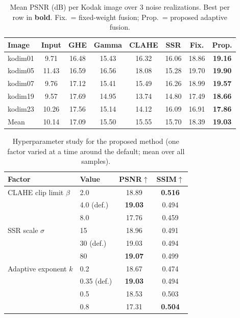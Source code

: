 \documentclass[conference,a4paper]{IEEEtran}
\begin{document}
\begin{table}[t]
\centering
\caption{Mean PSNR (dB) per Kodak image over 3 noise realizations.
Best per row in \textbf{bold}. Fix.\ = fixed-weight fusion; Prop.\ = proposed
adaptive fusion.}
\label{tab:perimage}
\setlength{\tabcolsep}{2.6pt}
\begin{tabular}{lccccccc}
\toprule
Image & Input & GHE & Gamma & CLAHE & SSR & Fix. & Prop. \\
\midrule
kodim01 & 9.71  & 16.48 & 15.43 & 16.32 & 16.06 & 18.86 & \textbf{19.16} \\
kodim05 & 11.43 & 16.59 & 16.56 & 18.08 & 15.28 & 19.70 & \textbf{19.90} \\
kodim07 & 9.76  & 17.12 & 15.41 & 15.49 & 16.26 & 18.99 & \textbf{19.57} \\
kodim19 & 9.57  & 17.69 & 14.95 & 13.74 & 14.80 & 17.49 & \textbf{18.66} \\
kodim23 & 10.26 & 17.56 & 15.14 & 14.12 & 16.09 & 16.91 & \textbf{17.86} \\
\midrule
Mean    & 10.14 & 17.09 & 15.50 & 15.55 & 15.70 & 18.39 & \textbf{19.03} \\
\bottomrule
\end{tabular}
\end{table}

\begin{table}[t]
\centering
\caption{Hyperparameter study for the proposed method (one factor varied at a
time around the default; mean over all samples).}
\label{tab:hyper}
\begin{tabular}{llcc}
\toprule
Factor & Value & PSNR$\uparrow$ & SSIM$\uparrow$ \\
\midrule
CLAHE clip limit $\beta$ & 2.0 & 18.89 & \textbf{0.516} \\
                         & 4.0 (def.) & \textbf{19.03} & 0.494 \\
                         & 8.0 & 17.76 & 0.459 \\
\midrule
SSR scale $\sigma$       & 15  & 18.96 & 0.491 \\
                         & 30 (def.) & 19.03 & 0.494 \\
                         & 80  & \textbf{19.07} & 0.499 \\
\midrule
Adaptive exponent $k$    & 0.2 & 18.67 & 0.474 \\
                         & 0.35 (def.) & \textbf{19.03} & 0.494 \\
                         & 0.5 & 18.53 & 0.503 \\
                         & 0.8 & 17.31 & \textbf{0.504} \\
\bottomrule
\end{tabular}
\end{table}
\end{document}

